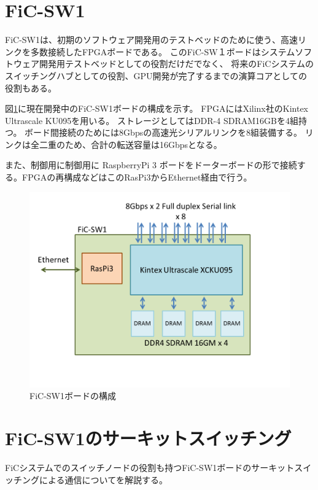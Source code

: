 \section{FiC-SW1}
FiC-SW1は、初期のソフトウェア開発用のテストベッドのために使う、高速リンクを多数接続したFPGAボードである。
このFiC-SW１ボードはシステムソフトウェア開発用テストベッドとしての役割だけだでなく、
将来のFiCシステムのスイッチングハブとしての役割、GPU開発が完了するまでの演算コアとしての役割もある。


図\ref{fig_sw1}に現在開発中のFiC-SW1ボードの構成を示す。
FPGAにはXilinx社のKintex Ultrascale KU095を用いる。
ストレージとしてはDDR-4 SDRAM16GBを4組持つ。
ボード間接続のためには8Gbpsの高速光シリアルリンクを8組装備する。
リンクは全二重のため、合計の転送容量は16Gbpsとなる。

また、制御用に制御用に RaspberryPi 3 ボードをドーターボードの形で接続する。FPGAの再構成などはこのRasPi3からEthernet経由で行う。

\begin{figure}[ht]  
 \begin{center}   
	\includegraphics[width=1.0\columnwidth,bb=0 0 720 540]{img/ficsw1.png}
  \caption{FiC-SW1ボードの構成}
  \label{fig_sw1}  
 \end{center}  
\end{figure}

\section{FiC-SW1のサーキットスイッチング}
FiCシステムでのスイッチノードの役割も持つFiC-SW1ボードのサーキットスイッチングによる通信についてを解説する。

